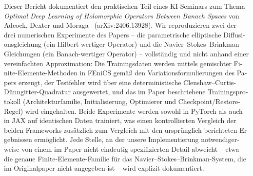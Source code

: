 \cleardoubleoddpage%
\begin{otherlanguage}{ngerman}
\begin{abstract*}
Dieser Bericht dokumentiert den praktischen Teil eines KI-Seminars zum
Thema \emph{Optimal Deep Learning of Holomorphic Operators Between Banach
Spaces} von Adcock, Dexter und Moraga~\cite{adcock2024holomorphic}
(arXiv:2406.13928). Wir reproduzieren zwei der drei numerischen
Experimente des Papers -- die parametrische elliptische
Diffusionsgleichung (ein Hilbert-wertiger Operator) und die
Navier--Stokes--Brinkman-Gleichungen (ein Banach-wertiger Operator) --
vollständig und nicht anhand einer vereinfachten Approximation: Die
Trainingsdaten werden mittels gemischter Finite-Elemente-Methoden in
FEniCS gemäß den Variationsformulierungen des Papers erzeugt, der
Testfehler wird über eine deterministische Clenshaw--Curtis-Dünngitter-Quadratur
ausgewertet, und das im Paper beschriebene Trainingsprotokoll
(Architekturfamilie, Initialisierung, Optimierer und
Checkpoint/Restore-Regel) wird eingehalten. Beide Experimente werden
sowohl in PyTorch als auch in JAX auf identischen Daten trainiert, was
einen kontrollierten Vergleich der beiden Frameworks zusätzlich zum
Vergleich mit den ursprünglich berichteten Ergebnissen ermöglicht. Jede
Stelle, an der unsere Implementierung notwendigerweise von einem im
Paper nicht eindeutig spezifizierten Detail abweicht -- etwa die genaue
Finite-Elemente-Familie für das Navier--Stokes--Brinkman-System, die im
Originalpaper nicht angegeben ist -- wird explizit dokumentiert.
\end{abstract*}
\end{otherlanguage}

